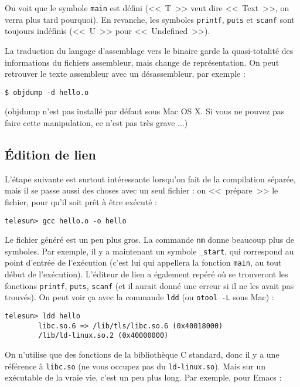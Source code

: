 \documentclass[11pt]{article}
\begin{document}
On voit que le symbole \texttt{main} est défini (<<~T~>> veut dire
<<~Text~>>, on verra plus tard pourquoi). En revanche, les symboles
\texttt{printf}, \texttt{puts} et \texttt{scanf} sont toujours
indéfinis (<<~U~>> pour <<~Undefined~>>).

La traduction du langage d'assemblage vers le binaire garde la
quasi-totalité des informations du fichiers assembleur, mais change de
représentation. On peut retrouver le texte assembleur avec un
désassembleur, par exemple :

\begin{verbatim}
$ objdump -d hello.o
\end{verbatim}

(objdump n'est pas installé par défaut sous Mac OS X. Si vous ne
pouvez pas faire cette manipulation, ce n'est pas très grave ...)

\subsection{Édition de lien}

L'étape suivante est surtout intéressante lorsqu'on fait de la
compilation séparée, mais il se passe aussi des choses avec un seul
fichier : on <<~prépare~>> le fichier, pour qu'il soit prêt à être
exécuté :

\begin{verbatim}
telesun> gcc hello.o -o hello
\end{verbatim}

Le fichier généré est un peu plus gros. La commande \texttt{nm} donne
beaucoup plus de symboles. Par exemple, il y a maintenant un symbole
\texttt{\_start}, qui correspond au point d'entrée de l'exécution
(c'est lui qui appellera la fonction \texttt{main}, au tout début de
l'exécution). L'éditeur de lien a également repéré où se trouveront
les fonctions \texttt{printf}, \texttt{puts}, \texttt{scanf} (et il
aurait donné une erreur si il ne les avait pas trouvés). On peut voir
ça avec la commande \texttt{ldd} (ou \texttt{otool -L} sous Mac) :

\begin{verbatim}
telesun> ldd hello
        libc.so.6 => /lib/tls/libc.so.6 (0x40018000)
        /lib/ld-linux.so.2 (0x40000000)
\end{verbatim}

On n'utilise que des fonctions de la bibliothèque C standard, donc il
y a une référence à \texttt{libc.so} (ne vous occupez pas du
\texttt{ld-linux.so}). Mais sur un exécutable de la vraie vie, c'est un
peu plus long. Par exemple, pour Emacs :
\end{document}
